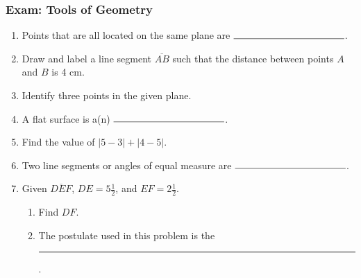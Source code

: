 \documentclass[12pt, oneside]{article}
\begin{document}
  \subsubsection*{Exam: Tools of Geometry}
    \vspace{0.5cm}
    \begin{enumerate}
      \item Points that are all located on the same plane are $\rule{4cm}{0.15mm}$.\bigskip


      \item Draw and label a line segment $\overline{AB}$ such that the distance between points $A$ and $B$ is 4 cm. \vspace{2cm}


      \item Identify three points in the given plane.\\[0.25in]
         \vspace{1cm}


      \item A flat surface is a(n) $\rule{4cm}{0.15mm}$. \bigskip

      \item Find the value of $|5-3|+|4-5|$. \bigskip

      \item Two line segments or angles of equal measure are $\rule{4cm}{0.15mm}$.
        \bigskip

      \item Given $\overline{DEF}$, $DE=5 \frac{1}{2}$, and $EF=2 \frac{1}{2}$.
      \begin{enumerate}
        \item Find ${DF}$.\\[.5in]
           \bigskip
        \item The postulate used in this problem is the \rule{6cm}{0.15mm}.
      \end{enumerate}


\end{enumerate}
\end{document}
